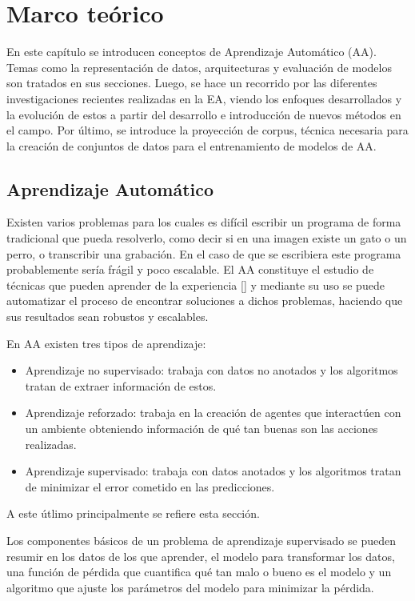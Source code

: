 \chapter{Marco teórico}\label{chapter:background}

En este capítulo se introducen conceptos de Aprendizaje Automático (AA). Temas
como la representación de datos, arquitecturas y evaluación de modelos son tratados en sus secciones.
Luego, se hace un recorrido por las diferentes investigaciones recientes realizadas en la EA, viendo
los enfoques desarrollados y la evolución de estos a partir del desarrollo e introducción de nuevos métodos en el
campo. Por último, se introduce la proyección de corpus, técnica necesaria para la creación de conjuntos 
de datos para el entrenamiento de modelos de AA.

\section{Aprendizaje Automático}

Existen varios problemas para los cuales es difícil escribir un programa de forma tradicional que pueda
resolverlo, como decir si en una imagen existe un gato o un perro, o transcribir una grabación. En el caso
de que se escribiera este programa probablemente sería frágil y poco escalable. El AA constituye el 
estudio de técnicas que pueden aprender de la experiencia [\cite{d2l}] y mediante su uso 
se puede automatizar el proceso de encontrar soluciones a dichos problemas, haciendo que sus resultados sean 
robustos y escalables. 

En AA existen tres tipos de aprendizaje:
\begin{itemize}
	\item Aprendizaje no supervisado: trabaja con datos no anotados y los algoritmos tratan de 
	extraer información de estos.
	\item Aprendizaje reforzado: trabaja en la creación de agentes que interactúen con 
	un ambiente obteniendo información de qué tan buenas son las acciones realizadas.
	\item Aprendizaje supervisado: trabaja con datos anotados y los algoritmos tratan de minimizar
	el error cometido en las predicciones.
\end{itemize}
A este útlimo principalmente se refiere esta sección.

Los componentes básicos de un problema de aprendizaje supervisado se pueden resumir en los datos de los que 
aprender, el modelo para transformar los datos, una función de pérdida que cuantifica qué tan malo o bueno es el 
modelo y un algoritmo que ajuste los parámetros del modelo para minimizar la pérdida.

